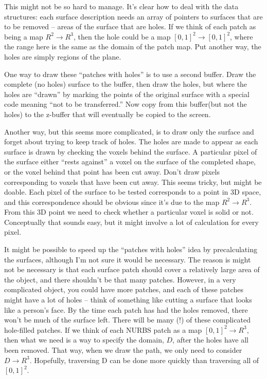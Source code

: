 \documentclass[titlepage,oneside,10pt]{article}
\begin{document}
This might not be so hard to manage. It's clear how to deal with the
data structures: each surface description needs an array of pointers
to surfaces that are to be removed -- areas of the surface that are
holes. If we think of each patch as being a map $R^2\rightarrow R^3$,
then the hole could be a map $[0,1]^2\rightarrow [0,1]^2$, where the range
here is the same as the domain of the patch map. Put another way, the
holes are simply regions of the plane.

One way to draw these ``patches with holes'' is to use a second
buffer. Draw the complete (no holes) surface to the buffer, then draw
the holes, but where the holes are ``drawn'' by marking the points of
the original surface with a special code meaning ``not to be
transferred.'' Now copy from this buffer(but not the holes) to the
z-buffer that will eventually be copied to the screen. 

Another way, but this seems more complicated, is to draw only the
surface and forget about trying to keep track of holes. The holes are
made to appear as each surface is drawn by checking the voxels behind
the surface. A particular pixel of the surface either ``rests
against'' a voxel on the surface of the completed shape, or the voxel
behind that point has been cut away. Don't draw pixels corresponding
to voxels that have been cut away. This seems tricky, but might be
doable. Each pixel of the surface to be tested corresponds to a point
in 3D space, and this correspondence should be obvious since it's due
to the map $R^2\rightarrow R^3$. From this 3D point we need to check
whether a particular voxel is solid or not. Conceptually that sounds
easy, but it might involve a lot of calculation for every pixel.

It might be possible to speed up the ``patches with holes'' idea by
precalculating the surfaces, although I'm not sure it would be
necessary. The reason is might not be necessary is that each surface
patch should cover a relatively large area of the object, and there
shouldn't be that many patches. However, in a very complicated object,
you could have more patches, and each of these patches might have a
lot of holes -- think of something like cutting a surface that looks
like a person's face. By the time each patch has had the holes
removed, there won't be much of the surface left. There will be many
(!) of these complicated hole-filled patches. If we think of each
NURBS patch as a map $[0,1]^2\rightarrow R^3$, then what we need is a
way to specify the domain, $D$, after the holes have all been
removed. That way, when we draw the path, we only need to consider
$D\rightarrow R^3$. Hopefully, traversing D can be done more quickly
than traversing all of $[0,1]^2$.
\end{document}
